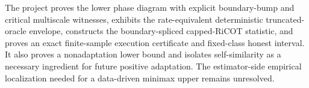 The project proves the lower phase diagram with explicit boundary-bump and critical multiscale witnesses, exhibits the rate-equivalent deterministic truncated-oracle envelope, constructs the boundary-spliced capped-RiCOT statistic, and proves an exact finite-sample execution certificate and fixed-class honest interval. It also proves a nonadaptation lower bound and isolates self-similarity as a necessary ingredient for future positive adaptation. The estimator-side empirical localization needed for a data-driven minimax upper remains unresolved.